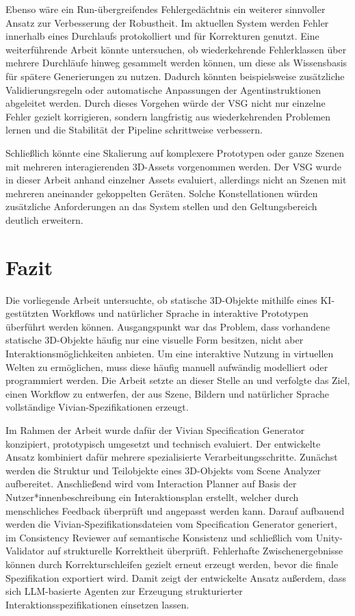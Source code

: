 Ebenso wäre ein Run-übergreifendes Fehlergedächtnis ein weiterer sinnvoller Ansatz zur Verbesserung der Robustheit. Im aktuellen System werden Fehler innerhalb eines Durchlaufs protokolliert und für Korrekturen genutzt. Eine weiterführende Arbeit könnte untersuchen, ob wiederkehrende Fehlerklassen über mehrere Durchläufe hinweg gesammelt werden können, um diese als Wissensbasis für spätere Generierungen zu nutzen. Dadurch könnten beispielsweise zusätzliche Validierungsregeln oder automatische Anpassungen der Agentinstruktionen abgeleitet werden. Durch dieses Vorgehen würde der VSG nicht nur einzelne Fehler gezielt korrigieren, sondern langfristig aus wiederkehrenden Problemen lernen und die Stabilität der Pipeline schrittweise verbessern.

Schließlich könnte eine Skalierung auf komplexere Prototypen oder ganze Szenen mit mehreren interagierenden 3D-Assets vorgenommen werden. Der VSG wurde in dieser Arbeit anhand einzelner Assets evaluiert, allerdings nicht an Szenen mit mehreren aneinander gekoppelten Geräten. Solche Konstellationen würden zusätzliche Anforderungen an das System stellen und den Geltungsbereich deutlich erweitern.

\section{Fazit}

Die vorliegende Arbeit untersuchte, ob statische 3D-Objekte mithilfe eines KI-gestützten Workflows und natürlicher Sprache in interaktive Prototypen überführt werden können. Ausgangspunkt war das Problem, dass vorhandene statische 3D-Objekte häufig nur eine visuelle Form besitzen, nicht aber Interaktionsmöglichkeiten anbieten. Um eine interaktive Nutzung in virtuellen Welten zu ermöglichen, muss diese häufig manuell aufwändig modelliert oder programmiert werden. Die Arbeit setzte an dieser Stelle an und verfolgte das Ziel, einen Workflow zu entwerfen, der aus Szene, Bildern und natürlicher Sprache vollständige Vivian-Spezifikationen erzeugt.

Im Rahmen der Arbeit wurde dafür der Vivian Specification Generator konzipiert, prototypisch umgesetzt und technisch evaluiert. Der entwickelte Ansatz kombiniert dafür mehrere spezialisierte Verarbeitungsschritte. Zunächst werden die Struktur und Teilobjekte eines 3D-Objekts vom Scene Analyzer aufbereitet. Anschließend wird vom Interaction Planner auf Basis der Nutzer*innenbeschreibung ein Interaktionsplan erstellt, welcher durch menschliches Feedback überprüft und angepasst werden kann. Darauf aufbauend werden die Vivian-Spezifikationsdateien vom Specification Generator generiert, im Consistency Reviewer auf semantische Konsistenz und schließlich vom Unity-Validator auf strukturelle Korrektheit überprüft. Fehlerhafte Zwischenergebnisse können durch Korrekturschleifen gezielt erneut erzeugt werden, bevor die finale Spezifikation exportiert wird. Damit zeigt der entwickelte Ansatz außerdem, dass sich LLM-basierte Agenten zur Erzeugung strukturierter Interaktionsspezifikationen einsetzen lassen.

